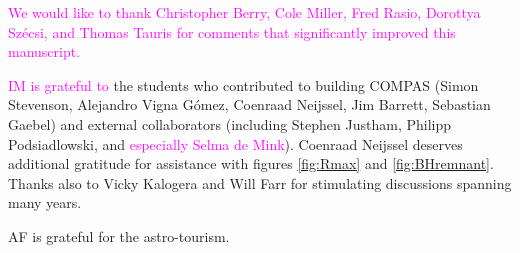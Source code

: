 \documentclass[iop,onecolumn]{revtex4}
\newcommand{\ilya}[1]{\textcolor{magenta}{#1}}
\begin{document}
\begin{acknowledgements}
\ilya{We would like to thank Christopher Berry, Cole Miller, Fred Rasio, Dorottya Sz\'{e}csi, and Thomas Tauris for comments that significantly improved this manuscript.}

\ilya{IM is grateful to} the students who contributed to building COMPAS (Simon Stevenson, Alejandro Vigna G\'{o}mez, Coenraad Neijssel, Jim Barrett, Sebastian Gaebel) and external collaborators (including Stephen Justham, Philipp Podsiadlowski, and \ilya{especially Selma de Mink}).  Coenraad Neijssel deserves additional gratitude for assistance with figures \ref{fig:Rmax} and \ref{fig:BHremnant}. Thanks also to Vicky Kalogera and Will Farr for stimulating discussions spanning many years. 

AF is grateful for the astro-tourism.
\end{acknowledgements}



\end{document}
